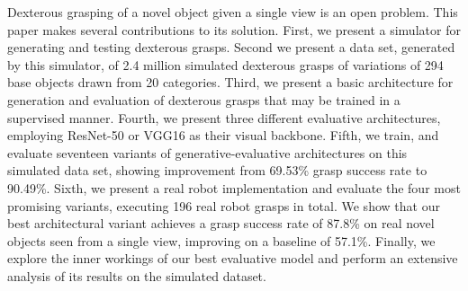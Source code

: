 Dexterous grasping of a novel object given a single view is an open problem. This paper makes several contributions to its solution. First, we present a simulator for generating and testing dexterous grasps. Second we present a data set, generated by  this simulator, of 2.4 million simulated dexterous grasps of variations of 294 base objects drawn from 20 categories. Third, we present a basic architecture for generation and evaluation of dexterous grasps that may be trained in a supervised manner. Fourth, we present three different evaluative architectures, employing ResNet-50 or VGG16 as their visual backbone. Fifth, we train, and evaluate seventeen variants of generative-evaluative architectures on this simulated data set, showing improvement from 69.53\% grasp success rate to 90.49\%. Sixth, we present a real robot implementation and evaluate the four most promising variants, executing 196 real robot grasps in total. We show that our best architectural variant achieves a grasp success rate of 87.8\% on real novel objects seen from a single view, improving on a baseline of 57.1\%. Finally, we explore the inner workings of our best evaluative model and perform an extensive analysis of its results on the simulated dataset. 



